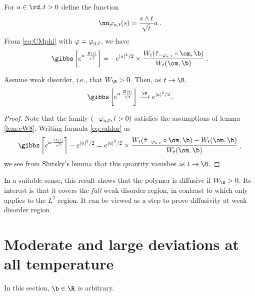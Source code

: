 For $a \in \rd, t>0$ define the function
\begin{equation} \nn
\vpat(s)=\frac{s \wedge t}{\sqrt t} a \;.
\end{equation}
From \eqref{eq:CMphi} with $\varphi=\varphi_{a,t}$, we have
\begin{eqnarray}\label{eq:valdor}
\gibbs \left[ e^{a \cdot \frac{B(t)}{\sqrt t}} \right] &=& e^{|a|^2/2} 
\times \frac{ W_t(\hat \tau_{-\vpat} \circ \om,\b)}{ W_t( \om,\b)} 
\;.
\end{eqnarray}
\begin{theorem} \label{prop:diff}
Assume weak disorder, i.e., that $W_\8>0$. Then, as $t \to \8$,
$$
\gibbs \left[ e^{a \cdot \frac{B(t)}{\sqrt t}} \right] \stackrel{\P}{\longrightarrow}  e^{|a|^2/2}.
$$
\end{theorem}
\begin{proof}
 Note that the family $(-\varphi_{a,t}, t >0)$ satisfies the assumptions of lemma \ref{lem:cW8}. Writing  formula \eqref{eq:valdor} as 
 $$
 \gibbs \left[ e^{a \cdot \frac{B(t)}{\sqrt t}} \right] - e^{|a|^2/2} =  e^{|a|^2/2} 
\times \frac{ W_t(\hat \tau_{-\vpat} \circ \om,\b) -  W_t( \om,\b)}{ W_t( \om,\b)} \;,
 $$
we see from Slutsky's lemma that this quantity vanishes as $t \to \8$.
\end{proof}
\begin{remark}
In a suitable sense, this result shows that the polymer is diffusive if $W_\8>0$. Its interest is that it covers  the {\em full} weak disorder region, in contrast to \cite[Th. 2.1.1]{CYkokyuroku} which only applies to the $L^2$ region. It can be viewed as a step to prove  diffusivity at weak disorder region. 
\end{remark}
\section{Moderate and large deviations at all temperature}
 
 In this section, $\b \in \R$ is arbitrary.
 
